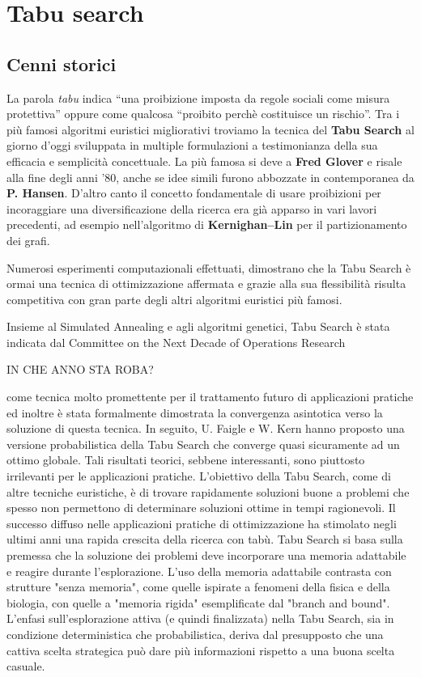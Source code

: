 \chapter{Tabu search}
\section{Cenni storici}
La parola \textit{tabu} indica “una proibizione imposta da regole sociali come misura protettiva” oppure come qualcosa “proibito perchè costituisce un rischio”.
Tra i più famosi algoritmi euristici migliorativi troviamo la tecnica del \textbf{Tabu Search} al giorno d'oggi sviluppata in multiple formulazioni a testimonianza della sua efficacia e semplicità concettuale. La più famosa si deve a \textbf{Fred Glover} e risale alla fine degli anni '80, anche se idee simili furono abbozzate in contemporanea da \textbf{P. Hansen}. D'altro canto il concetto fondamentale di usare proibizioni per incoraggiare una diversificazione della ricerca era già apparso in vari lavori precedenti, ad esempio nell'algoritmo di \textbf{Kernighan–Lin} per il partizionamento dei grafi.

Numerosi esperimenti computazionali effettuati, dimostrano che la Tabu Search è ormai una tecnica di ottimizzazione affermata e grazie alla sua flessibilità risulta competitiva con gran parte degli altri algoritmi euristici più famosi.

Insieme al Simulated Annealing e agli algoritmi genetici, Tabu Search è stata indicata dal Committee on the Next Decade of Operations Research 


IN CHE ANNO STA ROBA? 


come tecnica molto promettente per il trattamento futuro di applicazioni pratiche ed inoltre è stata formalmente dimostrata la convergenza asintotica verso la soluzione di questa tecnica.
In seguito, U. Faigle e W. Kern hanno proposto una versione probabilistica della Tabu
Search che converge quasi sicuramente ad un ottimo globale. Tali risultati teorici, sebbene
interessanti, sono piuttosto irrilevanti per le applicazioni pratiche. L'obiettivo della Tabu Search, come di altre tecniche euristiche, è di trovare rapidamente soluzioni buone a
problemi che spesso non permettono di determinare soluzioni ottime in tempi ragionevoli.
Il successo diffuso nelle applicazioni pratiche di ottimizzazione ha stimolato negli ultimi anni una rapida crescita della ricerca con tabù.
Tabu Search si basa sulla premessa che la soluzione dei problemi deve incorporare una memoria adattabile e reagire durante l'esplorazione. L'uso della memoria adattabile contrasta con strutture "senza memoria", come quelle ispirate a fenomeni della fisica e della biologia, con quelle a "memoria rigida" esemplificate dal "branch and bound". 
L'enfasi sull'esplorazione attiva (e quindi finalizzata) nella Tabu Search, sia in condizione deterministica che probabilistica, deriva dal presupposto che una cattiva scelta strategica può dare più informazioni rispetto a una buona scelta casuale.
\newpage

